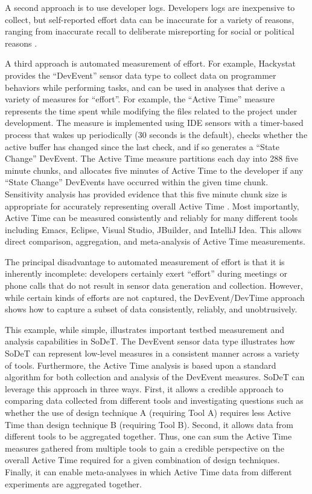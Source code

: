 A second approach is to use developer logs.  Developers logs are
inexpensive to collect, but self-reported effort data can be inaccurate for
a variety of reasons, ranging from inaccurate recall to deliberate
misreporting for social or political reasons \cite{Hochstein05}.

A third approach is automated measurement of effort. For example, Hackystat provides the 
``DevEvent'' sensor data type to collect data on programmer
behaviors while performing tasks, and can be used in analyses that derive a
variety of measures for ``effort''.  For example, the ``Active Time''
measure represents the time spent while modifying the files related to the
project under development.  The measure is implemented using IDE sensors
with a timer-based process that wakes up periodically (30 seconds is the
default), checks whether the active buffer has changed since the last
check, and if so generates a ``State Change'' DevEvent.  The Active Time
measure partitions each day into 288 five minute chunks, and allocates five
minutes of Active Time to the developer if any ``State Change'' DevEvents
have occurred within the given time chunk.  Sensitivity analysis has
provided evidence that this five minute chunk size is appropriate for
accurately representing overall Active Time \cite{csdl2-02-09}. Most
importantly, Active Time can be measured consistently and reliably for many
different tools including Emacs, Eclipse, Visual Studio, JBuilder, and
IntelliJ Idea.  This allows direct comparison, aggregation, and
meta-analysis of Active Time measurements.

The principal disadvantage to automated measurement of effort is that it is
inherently incomplete: developers certainly exert ``effort'' during
meetings or phone calls that do not result in sensor data generation and
collection.  However, while certain kinds of efforts are not captured, the
DevEvent/DevTime approach shows how to capture a subset of data
consistently, reliably, and unobtrusively.

This example, while simple, illustrates important testbed measurement and
analysis capabilities in SoDeT.  The DevEvent sensor data type illustrates
how SoDeT can represent low-level measures in a consistent manner across a
variety of tools.  Furthermore, the Active Time analysis is based upon a
standard algorithm for both collection and analysis of the DevEvent measures.
SoDeT can leverage this approach in three ways. First, it allows a credible
approach to comparing data collected from different tools and investigating
questions such as whether the use of design technique A (requiring Tool A)
requires less Active Time than design technique B (requiring Tool B).  Second,
it allows data from different tools to be aggregated together. Thus, one
can sum the Active Time measures gathered from multiple tools to gain a
credible perspective on the overall Active Time required for a given
combination of design techniques. Finally, it can enable meta-analyses in
which Active Time data from different experiments are aggregated together.

